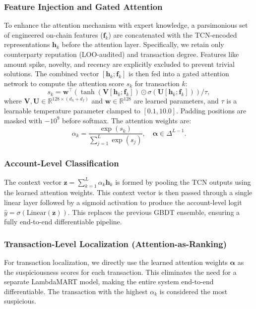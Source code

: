 \documentclass[conference]{IEEEtran}
\begin{document}
\subsubsection{Feature Injection and Gated Attention}
To enhance the attention mechanism with expert knowledge, a parsimonious set of engineered on-chain features ($\mathbf{f}_k$) are concatenated with the TCN-encoded representations $\mathbf{h}_k$ before the attention layer. Specifically, we retain only counterparty reputation (LOO-audited) and transaction degree. Features like amount spike, novelty, and recency are explicitly excluded to prevent trivial solutions. The combined vector $[\mathbf{h}_k; \mathbf{f}_k]$ is then fed into a gated attention network \cite{ilse2018} to compute the attention score $s_k$ for transaction $k$:
\begin{equation}
s_k = \mathbf{w}^\top \left( \tanh(\mathbf{V} [\mathbf{h}_k; \mathbf{f}_k]) \odot \sigma(\mathbf{U} [\mathbf{h}_k; \mathbf{f}_k]) \right) / \tau,
\end{equation}
where $\mathbf{V}, \mathbf{U} \in \mathbb{R}^{128 \times (d_h + d_f)}$ and $\mathbf{w} \in \mathbb{R}^{128}$ are learned parameters, and $\tau$ is a learnable temperature parameter clamped to $[0.1, 10.0]$. Padding positions are masked with $-10^9$ before softmax. The attention weights are:
\begin{equation}
\alpha_k = \frac{\exp(s_k)}{\sum_{j=1}^L \exp(s_j)}, \quad \boldsymbol{\alpha} \in \Delta^{L-1}.
\end{equation}

\subsubsection{Account-Level Classification}
The context vector $\mathbf{z} = \sum_{k=1}^L \alpha_k \mathbf{h}_k$ is formed by pooling the TCN outputs using the learned attention weights. This context vector is then passed through a single linear layer followed by a sigmoid activation to produce the account-level logit $\hat{y} = \sigma(\text{Linear}(\mathbf{z}))$. This replaces the previous GBDT ensemble, ensuring a fully end-to-end differentiable pipeline.

\subsubsection{Transaction-Level Localization (Attention-as-Ranking)}
For transaction localization, we directly use the learned attention weights $\boldsymbol{\alpha}$ as the suspiciousness scores for each transaction. This eliminates the need for a separate LambdaMART model, making the entire system end-to-end differentiable. The transaction with the highest $\alpha_k$ is considered the most suspicious.
\end{document}
